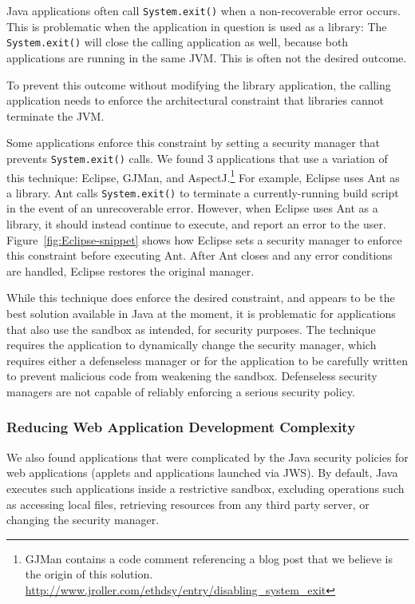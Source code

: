 \documentclass{sig-alternate}
\begin{document}
Java applications often call \texttt{System.exit()} when a non-recoverable
error occurs. This is problematic when the application in question is 
used as a library: The \texttt{System.exit()} will close the calling
application as well, because both applications
are running in the same JVM. This is often not the desired
outcome.

To prevent this outcome without modifying the library application,
the calling application needs to enforce the architectural constraint
that libraries cannot terminate the JVM. 

Some applications
enforce this constraint by setting a security manager
that prevents \texttt{System.exit()} calls.
We found 3 applications that use a variation of this technique:
Eclipse, GJMan, and AspectJ.\footnote{%
GJMan contains a code comment referencing a
blog post that we believe is the origin of this solution. \url{http://www.jroller.com/ethdsy/entry/disabling_system_exit}}
For example, Eclipse uses Ant as a library.  Ant calls \texttt{System.exit()} to
terminate a currently-running build script in the event of an unrecoverable
error.  However, when Eclipse uses Ant as a library, it
should instead continue to execute, and report an error to the user.
Figure~\ref{fig:Eclipse-snippet} shows
how Eclipse sets a security manager to enforce this constraint
before executing Ant. After Ant closes and any error conditions
are handled, Eclipse restores the original manager.

While this technique does enforce the
desired constraint, and appears to be the best solution available
in Java at the moment, it is problematic for applications that also 
use the sandbox as intended, for security purposes. The technique requires
the application to dynamically change the security manager, which requires either a defenseless manager or for the application
to be carefully written to prevent malicious code from weakening the sandbox. 
Defenseless security managers
are not capable of reliably enforcing a serious security policy.

\subsubsection{Reducing Web Application Development Complexity}\label{sub:Reducing-Web-Application-Complexity}

We also found applications that were complicated by the Java security policies
for web applications (applets and applications launched via JWS). By default,
Java executes such applications inside a restrictive 
sandbox, 
excluding operations such as accessing local files, retrieving resources
from any third party server, or changing the security manager. 
\end{document}
